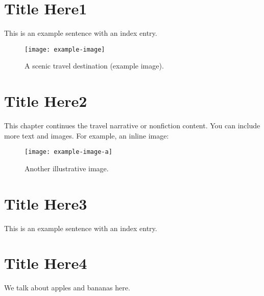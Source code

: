 \documentclass[10pt]{book}
\begin{document}
\mainmatter








\chapter{Title Here1}
This is an example sentence with an index entry.


\lipsum[1]  %

\begin{figure}[htbp]
  \centering
  \texttt{[image: example-image]} %
  \caption{A scenic travel destination (example image).}
\end{figure}

\lipsum[1]  %

\lipsum[2]  %

\chapter{Title Here2}
This chapter continues the travel narrative or nonfiction content. You can include more text and images. For example, an inline image:
\begin{figure}[htbp]
  \centering
  \texttt{[image: example-image-a]} 
  \caption{Another illustrative image.}
\end{figure}

\lipsum[1]  %




\chapter{Title Here3}
This is an example sentence with an index entry.

\chapter{Title Here4}
We talk about apples and bananas here.
\end{document}
